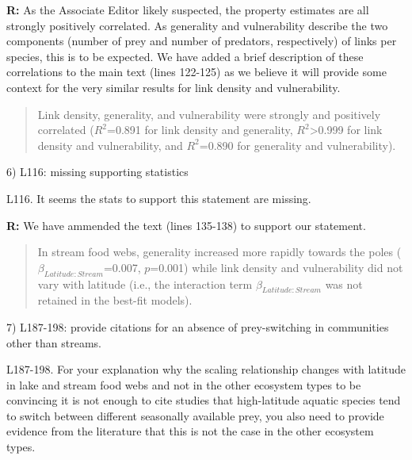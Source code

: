 \documentclass[12pt]{letter}
\newenvironment{refquote}{\bigskip \begin{it}}{\end{it}\smallskip}
\begin{document}
  \textbf{R:} As the Associate Editor likely suspected, the 
  property estimates are all strongly positively correlated. 
  As generality and vulnerability describe the two 
  components (number of prey and number of predators,
  respectively) of links per species, this is to be 
  expected. We have added a brief description of these 
  correlations to the main text (lines 122-125) as we 
  believe it will provide some context for the very similar 
  results for link density and vulnerability.

  \begin{quotation}

    Link density, generality, and vulnerability were strongly and positively
    correlated ($R^2$=0.891 for link density and generality,
    $R^2$\textgreater0.999 for link density and vulnerability, and $R^2$=0.890
    for generality and vulnerability).

  \end{quotation}


  6) L116: missing supporting statistics

  \begin{refquote}

    L116. It seems the stats to support this statement are missing.

  \end{refquote}
 

  \textbf{R:} We have ammended the text (lines 135-138) to support our statement.

  \begin{quotation}
    In stream food
    webs, generality increased more rapidly towards the poles
    ($\beta_{Latitude:Stream}$=0.007, $p$=0.001) while link density and
    vulnerability did not vary with latitude (i.e., the interaction term $\beta_{Latitude:Stream}$ was not retained in the best-fit models).
  \end{quotation}


  7) L187-198: provide citations for an absence of prey-switching in communities other than streams.

  \begin{refquote}

    L187-198. For your explanation why the scaling relationship changes with
    latitude in lake and stream food webs and not in the other ecosystem types
    to be convincing it is not enough to cite studies that high-latitude
    aquatic species tend to switch between different seasonally available
    prey, you also need to provide evidence from the literature that this is
    not the case in the other ecosystem types.

  \end{refquote}
\end{document}
